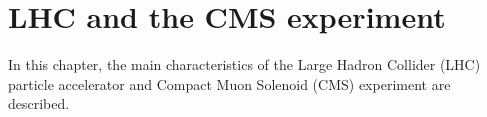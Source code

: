 \chapter{LHC and the CMS experiment}\label{chap2}
\thispagestyle{empty}
In this chapter, the main characteristics of the Large Hadron Collider (LHC) particle accelerator and Compact Muon Solenoid (CMS) experiment are described.





